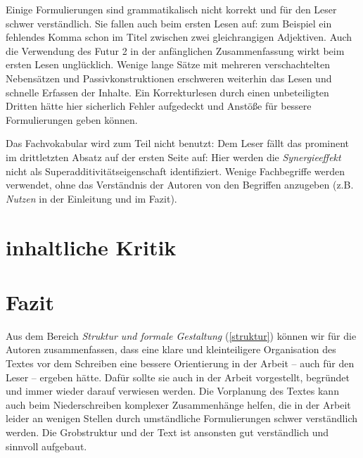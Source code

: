 \documentclass[sigconf]{acmart}
\begin{document}
Einige Formulierungen sind grammatikalisch nicht korrekt und für den Leser schwer verständlich. Sie fallen auch beim ersten Lesen auf: zum Beispiel ein fehlendes Komma schon im Titel zwischen zwei gleichrangigen Adjektiven. Auch die Verwendung des Futur 2 in der anfänglichen Zusammenfassung wirkt beim ersten Lesen unglücklich. Wenige lange Sätze mit mehreren verschachtelten Nebensätzen und Passivkonstruktionen erschweren weiterhin das Lesen und schnelle Erfassen der Inhalte. Ein Korrekturlesen durch einen unbeteiligten Dritten hätte hier sicherlich Fehler aufgedeckt und Anstöße für bessere Formulierungen geben können.

Das Fachvokabular wird zum Teil nicht benutzt: Dem Leser fällt das prominent im drittletzten Absatz auf der ersten Seite auf: Hier werden die \textit{Synergieeffekt} nicht als Superadditivitätseigenschaft identifiziert. Wenige Fachbegriffe werden verwendet, ohne das Verständnis der Autoren von den Begriffen anzugeben (z.B. \textit{Nutzen} in der Einleitung und im Fazit).


\section{inhaltliche Kritik}



\section{Fazit}
Aus dem Bereich \textit{Struktur und formale Gestaltung} (\ref{struktur}) können wir für die Autoren zusammenfassen, dass eine klare und kleinteiligere Organisation des Textes vor dem Schreiben eine bessere Orientierung in der Arbeit -- auch für den Leser -- ergeben hätte. Dafür sollte sie auch in der Arbeit vorgestellt, begründet und immer wieder darauf verwiesen werden. Die Vorplanung des Textes kann auch beim Niederschreiben komplexer Zusammenhänge helfen, die in der Arbeit leider an wenigen Stellen durch umständliche Formulierungen schwer verständlich werden. Die Grobstruktur und der Text ist ansonsten gut verständlich und sinnvoll aufgebaut.
\end{document}
